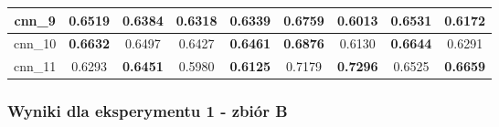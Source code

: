 \begin{table}[p]
\begin{tabular}{|c|c|c|c|c|c|c|c|c|}
        cnn\_9   & \textbf{0.6519}                     & 0.6384                              & 0.6318                              & \textbf{0.6339}                     & \textbf{0.6759}                     & 0.6013                              & \textbf{0.6531}                     & 0.6172                              \\ \hline
        cnn\_10  & \textbf{0.6632}                     & 0.6497                              & 0.6427                              & \textbf{0.6461}                     & \textbf{0.6876}                     & 0.6130                              & \textbf{0.6644}                     & 0.6291                              \\ \hline
        cnn\_11  & 0.6293                              & \textbf{0.6451}                     & 0.5980                              & \textbf{0.6125}                     & 0.7179                              & \textbf{0.7296}                     & 0.6525                              & \textbf{0.6659}                     \\ \hline
    \end{tabular}
\end{table}


\newpage %
\subsubsection{\label{wyniki_eksperymentow_eks_1b}Wyniki dla eksperymentu 1 - zbiór B}


